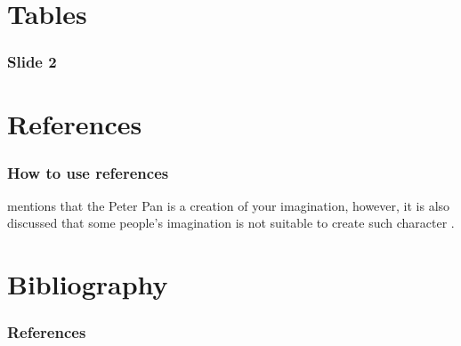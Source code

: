 \documentclass[english,svgnames,notes=hide,12pt]{beamer}
\begin{document}
\section{Tables}
\begin{frame}
	\frametitle{Slide 2}
\end{frame}

\section{References}
\begin{frame}
    \frametitle{How to use references}
     mentions that the Peter Pan is a creation of your imagination, however, it is also discussed that some people's imagination is not suitable to create such character .
\end{frame}

\section*{Bibliography}
\begin{frame}[allowframebreaks]
    \frametitle{References}
    \fontsize{5pt}{6.2}\selectfont
    
    \renewcommand{\bibliographytypesize}{\small}
    
\end{frame}
\end{document}
